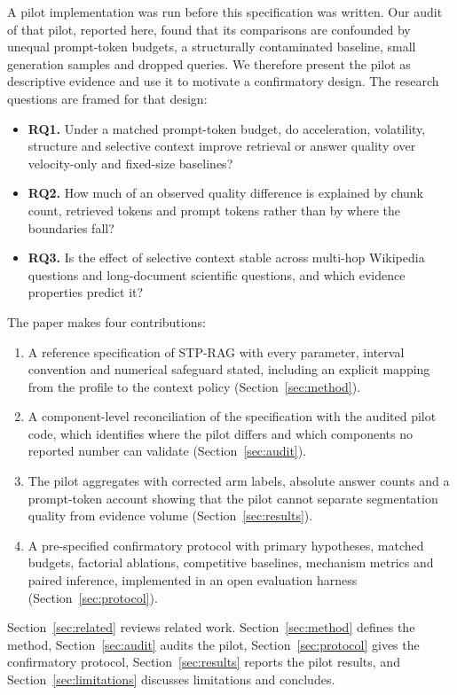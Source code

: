 \documentclass[10pt,a4paper]{article}
\begin{document}
A pilot implementation was run before this specification was written. Our audit of that pilot, reported here, found that its comparisons are confounded by unequal prompt-token budgets, a structurally contaminated baseline, small generation samples and dropped queries. We therefore present the pilot as descriptive evidence and use it to motivate a confirmatory design. The research questions are framed for that design:

\begin{itemize}
  \item \textbf{RQ1.} Under a matched prompt-token budget, do acceleration, volatility, structure and selective context improve retrieval or answer quality over velocity-only and fixed-size baselines?
  \item \textbf{RQ2.} How much of an observed quality difference is explained by chunk count, retrieved tokens and prompt tokens rather than by where the boundaries fall?
  \item \textbf{RQ3.} Is the effect of selective context stable across multi-hop Wikipedia questions and long-document scientific questions, and which evidence properties predict it?
\end{itemize}

\noindent The paper makes four contributions:
\begin{enumerate}
  \item A reference specification of STP-RAG with every parameter, interval convention and numerical safeguard stated, including an explicit mapping from the profile to the context policy (Section~\ref{sec:method}).
  \item A component-level reconciliation of the specification with the audited pilot code, which identifies where the pilot differs and which components no reported number can validate (Section~\ref{sec:audit}).
  \item The pilot aggregates with corrected arm labels, absolute answer counts and a prompt-token account showing that the pilot cannot separate segmentation quality from evidence volume (Section~\ref{sec:results}).
  \item A pre-specified confirmatory protocol with primary hypotheses, matched budgets, factorial ablations, competitive baselines, mechanism metrics and paired inference, implemented in an open evaluation harness (Section~\ref{sec:protocol}).
\end{enumerate}

Section~\ref{sec:related} reviews related work. Section~\ref{sec:method} defines the method, Section~\ref{sec:audit} audits the pilot, Section~\ref{sec:protocol} gives the confirmatory protocol, Section~\ref{sec:results} reports the pilot results, and Section~\ref{sec:limitations} discusses limitations and concludes.
\end{document}
